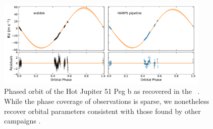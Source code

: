 \documentclass[modern]{aastex62}
\begin{document}
\begin{figure}
\centering
\includegraphics[width=4in]{51peg_planet}
\caption{Phased orbit of the Hot Jupiter 51 Peg b as recovered in the \wobble\ \RVs. While the phase coverage of \HARPS observations is sparse, we nonetheless recover orbital parameters consistent with those found by other \RV campaigns .  }
\label{fig:51peg_planet}
\end{figure}
\end{document}
